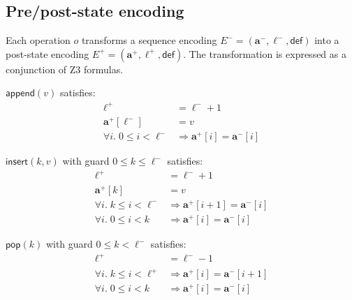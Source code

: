 \documentclass[11pt]{article}
\newcommand{\arrvar}[1]{\mathbf{a}_{#1}}
\newcommand{\lenvar}[1]{\ell_{#1}}
\newcommand{\defval}{\mathsf{def}}
\newcommand{\idx}{i}
\newcommand{\MutApp}{\ensuremath{\mathsf{append}}}
\newcommand{\MutIns}{\ensuremath{\mathsf{insert}}}
\newcommand{\MutPop}{\ensuremath{\mathsf{pop}}}
\newcommand{\prestate}[1]{#1^{-}}
\newcommand{\poststate}[1]{#1^{+}}
\begin{document}
\subsection{Pre/post-state encoding}

Each operation $o$ transforms a sequence encoding
$\prestate{E} = (\prestate{\arrvar{}},\prestate{\lenvar{}},\defval)$
into a post-state encoding
$\poststate{E} = (\poststate{\arrvar{}},\poststate{\lenvar{}},\defval)$.
The transformation is expressed as a conjunction of Z3 formulas.

\begin{definition}[Append]\label{def:append}
$\MutApp(v)$ satisfies:
\begin{align}
  \poststate{\lenvar{}} &= \prestate{\lenvar{}} + 1 \tag{App-Len}\\
  \poststate{\arrvar{}}[\prestate{\lenvar{}}] &= v \tag{App-New}\\
  \forall \idx.\; 0 \leq \idx < \prestate{\lenvar{}} &\Rightarrow \poststate{\arrvar{}}[\idx] = \prestate{\arrvar{}}[\idx] \tag{App-Frame}
\end{align}
\end{definition}

\begin{definition}[Insert]\label{def:insert}
$\MutIns(k, v)$ with guard $0 \leq k \leq \prestate{\lenvar{}}$ satisfies:
\begin{align}
  \poststate{\lenvar{}} &= \prestate{\lenvar{}} + 1 \tag{Ins-Len}\\
  \poststate{\arrvar{}}[k] &= v \tag{Ins-At}\\
  \forall \idx.\; k \leq \idx < \prestate{\lenvar{}} &\Rightarrow \poststate{\arrvar{}}[\idx+1] = \prestate{\arrvar{}}[\idx] \tag{Ins-Shift}\\
  \forall \idx.\; 0 \leq \idx < k &\Rightarrow \poststate{\arrvar{}}[\idx] = \prestate{\arrvar{}}[\idx] \tag{Ins-Frame}
\end{align}
\end{definition}

\begin{definition}\label{def:pop}
$\MutPop(k)$ with guard $0 \leq k < \prestate{\lenvar{}}$ satisfies:
\begin{align}
  \poststate{\lenvar{}} &= \prestate{\lenvar{}} - 1 \tag{Pop-Len}\\
  \forall \idx.\; k \leq \idx < \poststate{\lenvar{}} &\Rightarrow \poststate{\arrvar{}}[\idx] = \prestate{\arrvar{}}[\idx+1] \tag{Pop-Shift}\\
  \forall \idx.\; 0 \leq \idx < k &\Rightarrow \poststate{\arrvar{}}[\idx] = \prestate{\arrvar{}}[\idx] \tag{Pop-Frame}
\end{align}
\end{definition}
\end{document}
